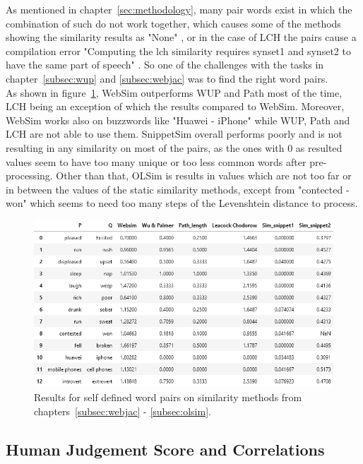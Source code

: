\documentclass[conference]{IEEEtran}
\begin{document}
As mentioned in chapter~\ref{sec:methodology}, many pair words exist in which the combination of such do not work together, which causes some of the methods showing the similarity results as "None" \cite{perkins}, or in the case of LCH the pairs cause a compilation error "Computing the lch similarity requires synset1 and synset2 to have the same part of speech" \cite{wordnet}. So one of the challenges with the tasks in chapter~\ref{subsec:wup} and \ref{subsec:webjac} was to find the right word pairs.\\
As shown in figure~\ref{fig:simtable}, WebSim outperforms WUP and Path most of the time, LCH being an exception of which the results compared to WebSim. Moreover, WebSim works also on buzzwords like "Huawei - iPhone" while WUP, Path and LCH are not able to use them. SnippetSim overall performs poorly and is not resulting in any similarity on most of the pairs, as the ones with 0 as resulted values seem to have too many unique or too less common words after pre-processing. Other than that, OLSim is results in values which are not too far or in between the values of the static similarity methods, except from "contected - won" which seems to need too many  steps of the Levenshtein distance to process.

\begin{figure}[h]
\centerline{\includegraphics[scale=0.5]{img/table.png}}
\caption{Results for self defined word pairs on similarity methods from chapters~\ref{subsec:webjac} - \ref{subsec:olsim}.}
\label{fig:simtable}
\end{figure}

\subsection{Human Judgement Score and Correlations}
\end{document}
